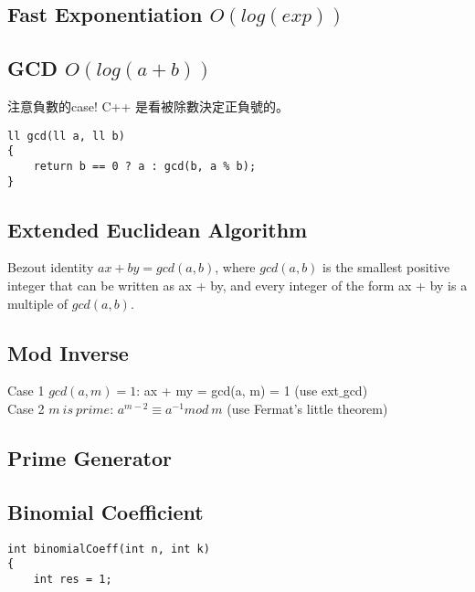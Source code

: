 \documentclass[10pt,oneside]{article}
\begin{document}
\begin{landscape}
\begin{multicols}{2}
\subsection{Fast Exponentiation $O(log(exp))$}



\subsection{GCD $O(log(a + b))$}

注意負數的case! C++ 是看被除數決定正負號的。

\begin{lstlisting}
ll gcd(ll a, ll b)
{
    return b == 0 ? a : gcd(b, a % b);
}
\end{lstlisting}

\subsection{Extended Euclidean Algorithm}

Bezout identity $ax + by = gcd(a, b)$, where $gcd(a, b)$ is the smallest positive integer that can be written as ax + by, and every integer of the form ax + by is a multiple of $gcd(a, b)$.



\subsection{Mod Inverse}

Case 1 $gcd(a, m) = 1$:  ax + my = gcd(a, m) = 1 (use ext$\_$gcd) \\

\noindent Case 2 $m\ is\ prime$: $a^{m - 2} \equiv a^{-1} mod\ m$ (use Fermat's little theorem)

\subsection{Prime Generator}


\subsection{Binomial Coefficient}

\begin{lstlisting}
int binomialCoeff(int n, int k)
{
    int res = 1;
 

\end{lstlisting}
\end{multicols}
\end{landscape}
\end{document}
